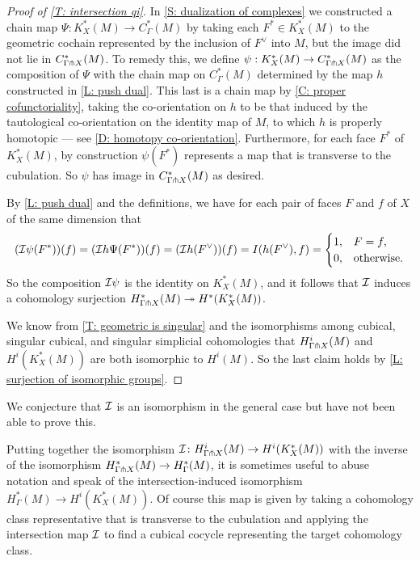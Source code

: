 \begin{proof}[Proof of \cref{T: intersection qi}]
	In \cref{S: dualization of complexes} we constructed a chain map $\Psi \colon K_X^*(M) \to C_\Gamma^*(M)$ by taking each $F^* \in K^*_X(M)$ to the geometric cochain represented by the inclusion of $F^\vee$ into $M$, but the image did not lie in $C^*_{\Gamma \pitchfork X}(M)$.
	To remedy this, we define $\psi:K_X^*(M) \to C_{\Gamma \pitchfork X}^*(M)$ as the composition of $\Psi$ with the chain map on $C^*_{\Gamma}(M)$ determined by the map $h$ constructed in \cref{L: push dual}.
	This last is a chain map by \cref{C: proper cofunctoriality}, taking the co-orientation on $h$ to be that induced by the tautological co-orientation on the identity map of $M$, to which $h$ is properly homotopic --- see \cref{D: homotopy co-orientation}.
	Furthermore, for each face $F^*$ of $K_X^*(M)$, by construction $\psi(F^*)$ represents a map that is transverse to the cubulation.
	So $\psi$ has image in $C_{\Gamma \pitchfork X}^*(M)$ as desired.

	By \cref{L: push dual} and the definitions, we have for each pair of faces $F$ and $f$ of $X$ of the same dimension that
	\begin{equation*}
		(\mathcal{I} \psi(F^*))(f) = (\mathcal{I} h \Psi(F^*))(f)\\
		= (\mathcal{I} h (F^\vee))(f)\\
		= I( h (F^\vee) , f) \\
		=
			\begin{cases}
				1, &  F=f,\\
				0, & \text{otherwise.}
			\end{cases}
	\end{equation*}
	So the composition $\mathcal{I} \psi$ is the identity on $K^*_X(M)$, and it follows that $\mathcal{I}$ induces a cohomology surjection $H^*_{\Gamma \pitchfork X}(M)\twoheadrightarrow H^*(K_X^*(M))$.

	We know from \cref{T: geometric is singular} and the isomorphisms among cubical, singular cubical, and singular simplicial cohomologies that $H^i_{\Gamma \pitchfork X}(M)$ and $H^i(K_X^*(M))$ are both isomorphic to $H^i(M)$.
	So the last claim holds by \cref{L: surjection of isomorphic groups}.
\end{proof}



We conjecture that $\mathcal{I}$ is an isomorphism in the general case but have not been able to prove this.

\begin{remark}\label{R: intersection map extension}
	Putting together the isomorphism $\mathcal{I} \colon H^i_{\Gamma \pitchfork X}(M) \to H^i(K_X^*(M))$ with the inverse of the isomorphism $H^*_{\Gamma \pitchfork X}(M) \to H^*_\Gamma(M)$, it is sometimes useful to abuse notation and speak of the intersection-induced isomorphism
	$H^*_\Gamma(M) \to H^i(K_X^*(M))$.
	Of course this map is given by taking a cohomology class representative that is transverse to the cubulation and applying the intersection map $\mathcal{I}$ to find a cubical cocycle representing the target cohomology class.
\end{remark}